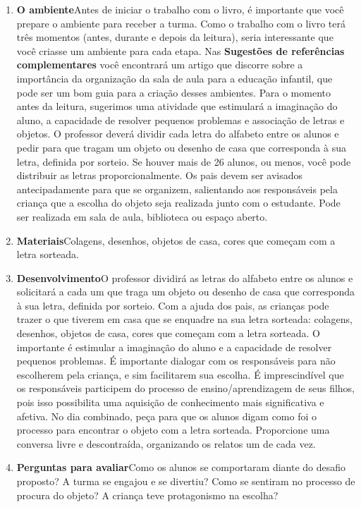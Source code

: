 \documentclass[11pt]{extarticle}
\begin{document}
\begin{enumerate}
\item \textbf{O ambiente}\quad Antes de iniciar o trabalho com o livro, é importante que você 
prepare o ambiente para receber a turma. Como o trabalho com o livro terá 
três momentos (antes, durante e depois da leitura), seria interessante que você 
criasse um ambiente para cada etapa. Nas \textbf{Sugestões de referências complementares} 
você encontrará um artigo que discorre sobre a importância da organização da sala 
de aula para a educação infantil, que pode ser um bom guia para a criação desses 
ambientes.
Para o momento antes da leitura, sugerimos uma atividade que estimulará a imaginação do aluno, a capacidade de resolver pequenos problemas e associação de letras e objetos. O professor deverá dividir cada letra do alfabeto entre os alunos e pedir para que tragam um objeto ou desenho de casa que corresponda à sua letra, definida por sorteio. Se houver mais de 26 alunos, ou menos, você pode distribuir as letras proporcionalmente. Os pais devem ser avisados antecipadamente para que se organizem, salientando aos responsáveis pela criança que a escolha do objeto seja realizada junto com o estudante. Pode ser realizada em sala de aula, biblioteca ou espaço aberto.

\item \textbf{Materiais}\quad Colagens, desenhos, objetos de casa, cores que começam com a letra sorteada.

\item \textbf{Desenvolvimento}\quad O professor dividirá as letras do alfabeto entre os alunos e solicitará a cada um que traga um objeto ou desenho de casa que corresponda à sua letra, definida por sorteio. Com a ajuda dos pais, as crianças pode trazer o que tiverem em casa que se enquadre na sua letra sorteada: colagens, desenhos, objetos de casa, cores que começam com a letra sorteada. O importante é estimular a imaginação do aluno e a capacidade de resolver pequenos problemas. É importante dialogar com os responsáveis para não escolherem pela criança, e sim facilitarem sua escolha. É imprescindível que os responsáveis participem do processo de ensino/aprendizagem de seus filhos, pois isso possibilita uma aquisição de conhecimento mais significativa e afetiva. No dia combinado, peça para que os alunos digam como foi o processo para encontrar o objeto com a letra sorteada. Proporcione uma conversa livre e descontraída, organizando os relatos um de cada vez.

\item \textbf{Perguntas para avaliar}\quad Como os alunos se comportaram diante do desafio proposto? A turma se engajou e se divertiu? Como se sentiram no processo de procura do objeto? A criança teve protagonismo na escolha? 

\end{enumerate}
\end{document}
